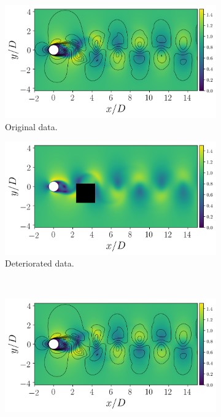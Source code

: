 \documentclass[review]{elsarticle}
\begin{document}
\begin{figure}[!tbp]%
  \centering%
  \begin{subfigure}[t]{0.45\textwidth}%
    \includegraphics[width=\textwidth]{./figs/cyl_umag0.png}%
    \caption{Original data.}\label{fig:cyl_umag0}%
  \end{subfigure}%
  \hfill%
  \begin{subfigure}[t]{0.45\textwidth}%
    \includegraphics[width=\textwidth]{./figs/cyl_umag0_masked.png}%
    \caption{Deteriorated data.}\label{fig:cyl_umag0_masked}%
  \end{subfigure}\\%
  \begin{subfigure}[t]{0.45\textwidth}%
    \includegraphics[width=\textwidth]{./figs/cyl_umagr.png}%

\end{subfigure}
\end{figure}
\end{document}
